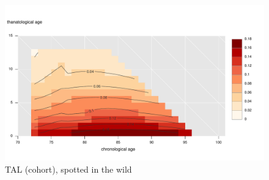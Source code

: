\documentclass[20pt]{beamer}
\begin{document}
\begin{frame}
\frametitle{~}
\begin{figure}[b]
    \centering
    \caption{TAL (cohort), spotted in the wild}
    \includegraphics[scale=.9]{Figures/LabPres/ATL_Surf_Male_psych_HRS.pdf}
\end{figure} 
\end{frame}
\end{document}
